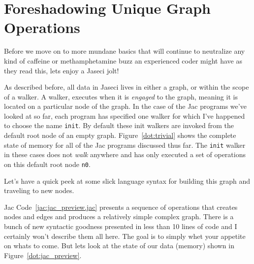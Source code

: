 \section{Foreshadowing Unique Graph Operations}
Before we move on to more mundane basics that will continue to neutralize any kind of caffeine or methamphetamine buzz an experienced \gls{coder} might have as they read this, lets enjoy a \gls{Jaseci jolt}!
\par
As described before, all data in Jaseci lives in either a graph, or within the scope of a \gls{walker}. A walker, executes when it is \emph{engaged} to the graph, meaning it is located on a particular node of the graph. In the case of the Jac programs we've looked at so far, each program has specified one walker for which I've happened to choose the name \texttt{init}. By default these init walkers are invoked from the default root node of an empty graph. Figure~\ref{dot:trivial} shows the complete state of memory for all of the Jac programs discussed thus far. The \texttt{init} walker in these cases does not \emph{walk} anywhere and has only executed a set of operations on this default root node \texttt{n0}.
\par
Let's have a quick peek at some slick language syntax for building this graph and traveling to new nodes.
\par
{}
\par
{}
Jac Code~\ref{jac:jac_preview.jac} presents a sequence of operations that creates nodes and edges and produces a relatively simple complex graph. There is a bunch of new syntactic goodness presented in less than 10 lines of code and I certainly won't describe them all here. The goal is to simply whet your appetite on whats to come. But lets look at the state of our data (memory) shown in Figure~\ref{dot:jac_preview}.


